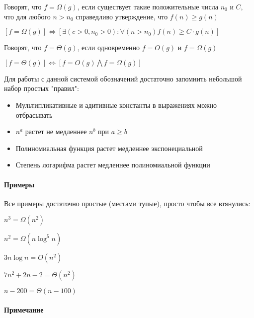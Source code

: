 \begin{Def}
	\label{def::omega_notation}
	Говорят, что $ f = \Omega ( g ) $, если существует такие положительные числа $ n _0 $ и $ C $, что для любого $ n > n _0 $ справедливо утверждение, что $ f ( n ) \ge g ( n ) $ 

	$ \left [ f = \Omega ( g ) \right ] \Leftrightarrow \left [ \exists ( c > 0 , n _0 > 0) : \forall ( n > n _0 ) f ( n ) \ge C \cdot g ( n ) \right ] $
\end{Def}

\begin{Def}
	\label{def::theta_notation}
	Говорят, что $ f = \Theta ( g ) $, если одновременно $ f = O ( g ) $ и $ f = \Omega ( g ) $

	$ \left [ f = \Theta ( g ) \right ] \Leftrightarrow \left [ f = O ( g ) \bigwedge f = \Omega ( g ) \right ] $
\end{Def}

Для работы с данной системой обозначений достаточно запомнить небольшой набор простых "правил":

\begin{itemize}
\item Мультипликативные и адитивные константы в выражениях можно отбрасывать

\item $ n^a $ растет не медленнее $ n^b $ при $ a \ge b $

\item Полиномиальная функция растет медленнее экспонециальной

\item Степень логарифма растет медленнее полиномиальной функции
\end{itemize}

\paragraph{Примеры}

Все примеры достаточно простые (местами тупые), просто чтобы все втянулись:

$ n^3 = \Omega ( n^2 ) $

$ n^2 = \Omega ( n \log ^5 n ) $

$ 3n \log n = O ( n^2 ) $

$ 7n^2 + 2n - 2 = \Theta ( n^2 ) $

$ n-200 = \Theta ( n - 100 ) $

\paragraph{Примечание}

